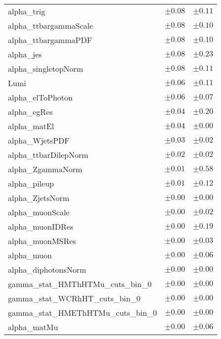 \begin{table}
\begin{center}
\begin{tabular*}{\textwidth}{@{\extracolsep{\fill}}lcc}
alpha\_trig         & $\pm 0.08$          & $\pm 0.11$       \\
alpha\_ttbargammaScale         & $\pm 0.08$          & $\pm 0.10$       \\
alpha\_ttbargammaPDF         & $\pm 0.08$          & $\pm 0.10$       \\
alpha\_jes         & $\pm 0.08$          & $\pm 0.23$       \\
alpha\_singletopNorm         & $\pm 0.08$          & $\pm 0.11$       \\
Lumi         & $\pm 0.06$          & $\pm 0.11$       \\
alpha\_elToPhoton         & $\pm 0.06$          & $\pm 0.07$       \\
alpha\_egRes         & $\pm 0.04$          & $\pm 0.20$       \\
alpha\_matEl         & $\pm 0.04$          & $\pm 0.00$       \\
alpha\_WjetsPDF         & $\pm 0.03$          & $\pm 0.02$       \\
alpha\_ttbarDilepNorm         & $\pm 0.02$          & $\pm 0.02$       \\
alpha\_ZgammaNorm         & $\pm 0.01$          & $\pm 0.58$       \\
alpha\_pileup         & $\pm 0.01$          & $\pm 0.12$       \\
alpha\_ZjetsNorm         & $\pm 0.00$          & $\pm 0.00$       \\
alpha\_muonScale         & $\pm 0.00$          & $\pm 0.02$       \\
alpha\_muonIDRes         & $\pm 0.00$          & $\pm 0.19$       \\
alpha\_muonMSRes         & $\pm 0.00$          & $\pm 0.03$       \\
alpha\_muon         & $\pm 0.00$          & $\pm 0.06$       \\
alpha\_diphotonsNorm         & $\pm 0.00$          & $\pm 0.00$       \\
gamma\_stat\_HMThHTMu\_cuts\_bin\_0         & $\pm 0.00$          & $\pm 0.00$       \\
gamma\_stat\_WCRhHT\_cuts\_bin\_0         & $\pm 0.00$          & $\pm 0.00$       \\
gamma\_stat\_HMEThHTMu\_cuts\_bin\_0         & $\pm 0.00$          & $\pm 0.00$       \\
alpha\_matMu         & $\pm 0.00$          & $\pm 0.06$       \\

\end{tabular*}
\end{center}
\end{table}
